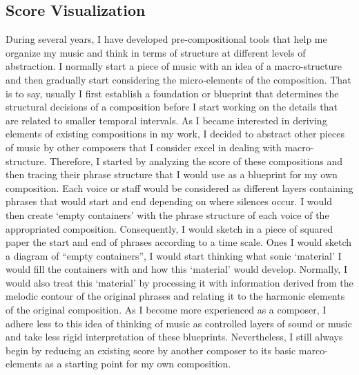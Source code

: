\subsection{Score Visualization}

During several years, I have developed pre-compositional tools that help me organize my music and think in terms of structure at different levels of abstraction. I normally start a piece of music with an idea of a macro-structure and then gradually start considering the micro-elements of the composition. That is to say, usually I first establish a foundation or blueprint that determines the structural decisions of a composition before I start working on the details that are related to smaller temporal intervals. As I became interested in deriving elements of existing compositions in my work, I decided to abstract other pieces of music by other composers that I consider excel in dealing with macro-structure. Therefore, I started by analyzing the score of these compositions and then tracing their phrase structure that I would use as a blueprint for my own composition. Each voice or staff would be considered as different layers containing phrases that would start and end depending on where silences occur. I would then create `empty containers' with the phrase structure of each voice of the appropriated composition. Consequently, I would sketch in a piece of squared paper the start and end of phrases according to a time scale. Ones I would sketch a diagram of ``empty containers'', I would start thinking what sonic `material' I would fill the containers with and how this `material' would develop. Normally, I would also treat this `material' by processing it with information derived from the melodic contour of the original phrases and relating it to the harmonic elements of the original composition. As I become more experienced as a composer, I adhere less to this idea of thinking of music as controlled layers of sound or music and take less rigid interpretation of these blueprints. Nevertheless, I still always begin by reducing an existing score by another composer to its basic marco-elements as a starting point for my own composition. 

